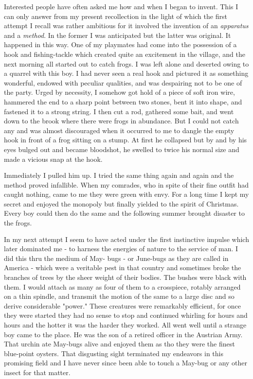 \documentclass[a4paper,12pt,english,twoside,openright]{memoir}
\begin{document}
	Interested people have often asked me how and when I began to invent.  This I can only answer 
	from my present recollection in the light of which the first attempt I recall was rather ambitious for 
	it involved the invention of an \emph{apparatus} and a \emph{method}.  In the former I was anticipated but the 
	latter was original.  It happened in this way.  One of my playmates had come into the possession 
	of a hook and fishing-tackle which created quite an excitement in the village, and the next 
	morning all started out to catch frogs.  I was left alone and deserted owing to a quarrel with this 
	boy.  I had never seen a real hook and pictured it as something wonderful, endowed with peculiar 
	qualities, and was despairing not to be one of the party.  Urged by necessity, I somehow got hold 
	of a piece of soft iron wire, hammered the end to a sharp point between two stones, bent it into 
	shape, and fastened it to a strong string.  I then cut a rod, gathered some bait, and went down to 
	the brook where there were frogs in abundance.  But I could not catch any and was almost 
	discouraged when it occurred to me to dangle the empty hook in front of a frog sitting on a stump.  
	At first he collapsed but by and by his eyes bulged out and became bloodshot, he swelled to 
	twice his normal size and made a vicious snap at the hook.  
	
	Immediately I pulled him up.  I tried the same thing again and again and the method proved 
	infallible.  When my comrades, who in spite of their fine outfit had caught nothing, came to me 
	they were green with envy.  For a long time I kept my secret and enjoyed the monopoly but finally 
	yielded to the spirit of Christmas.  Every boy could then do the same and the following summer 
	brought disaster to the frogs.  
	
	In my next attempt I seem to have acted under the first instinctive impulse which later dominated 
	me - to harness the energies of nature to the service of man.  I did this thru the medium of May-
	bugs - or June-bugs as they are called in America - which were a veritable pest in that country 
	and sometimes broke the branches of trees by the sheer weight of their bodies.  The bushes 
	were black with them.  I would attach as many as four of them to a crosspiece, rotably arranged 
	on a thin spindle, and transmit the motion of the same to a large disc and so derive considerable 
	"power." These creatures were remarkably efficient, for once they were started they had no sense 
	to stop and continued whirling for hours and hours and the hotter it was the harder they worked.  
	All went well until a strange boy came to the place.  He was the son of a retired officer in the 
	Austrian Army.  That urchin ate May-bugs alive and enjoyed them as tho they were the finest 
	blue-point oysters.  That disgusting sight terminated my endeavors in this promising field and I 
	have never since been able to touch a May-bug or any other insect for that matter.  
	
\end{document}

